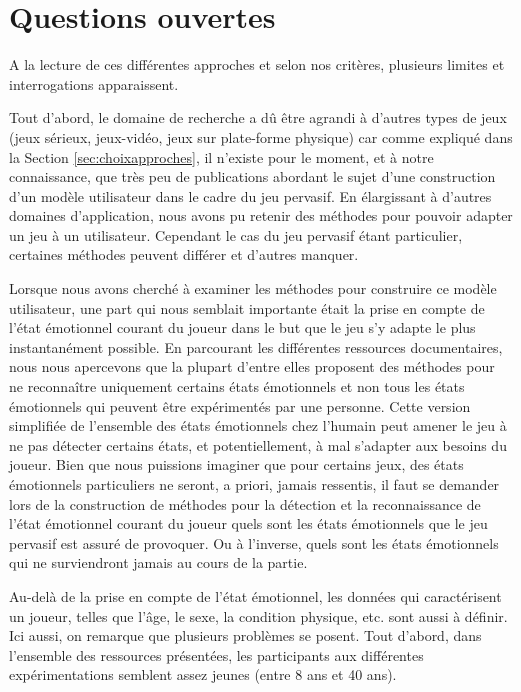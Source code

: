 \documentclass{article}
\begin{document}
\section{Questions ouvertes}\label{sec:questions}
    A la lecture de ces différentes approches et selon nos critères, plusieurs limites et interrogations apparaissent.\par
    Tout d’abord, le domaine de recherche a dû être agrandi à d’autres types de jeux (jeux sérieux, jeux-vidéo, jeux sur plate-forme physique) car comme expliqué dans la Section \ref{sec:choixapproches}, il n’existe pour le moment, et à notre connaissance, que très peu de publications abordant le sujet d’une construction d’un modèle utilisateur dans le cadre du jeu pervasif. 
    En élargissant à d’autres domaines d’application, nous avons pu retenir des méthodes pour pouvoir adapter un jeu à un utilisateur. 
    Cependant le cas du jeu pervasif étant particulier, certaines méthodes peuvent différer et d'autres manquer.\par
    Lorsque nous avons cherché à examiner les méthodes pour construire ce modèle utilisateur, une part qui nous semblait importante était la prise en compte de l’état émotionnel courant du joueur dans le but que le jeu s’y adapte le plus instantanément possible. 
    En parcourant les différentes ressources documentaires, nous nous  apercevons que la plupart d’entre elles proposent des méthodes pour ne reconnaître uniquement certains états émotionnels et non tous les états émotionnels qui peuvent être expérimentés par une personne.
    Cette version simplifiée de l’ensemble des états émotionnels chez l’humain peut amener le jeu à ne pas détecter certains états, et potentiellement, à mal s’adapter aux besoins du joueur. 
    Bien que nous puissions imaginer que pour certains jeux, des états émotionnels particuliers ne seront, a priori, jamais ressentis, il faut se demander lors de la construction de méthodes pour la détection et la reconnaissance de l’état émotionnel courant du joueur quels sont les états émotionnels que le jeu pervasif est assuré de provoquer. 
    Ou à l’inverse, quels sont les états émotionnels qui ne surviendront jamais au cours de la partie.\par
    Au-delà de la prise en compte de l’état émotionnel, les données qui caractérisent un joueur, telles que l’âge, le sexe, la condition physique, etc. sont aussi à définir. 
    Ici aussi, on remarque que plusieurs problèmes se posent. Tout d’abord, dans l’ensemble des ressources présentées, les participants aux différentes expérimentations semblent assez jeunes (entre 8 ans et 40 ans).
\end{document}
